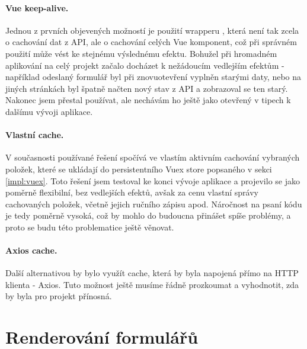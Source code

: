 \paragraph{Vue keep-alive.} Jednou z prvních objevených možností je použití wrapperu \cite{vue-keep-alive}, která není tak zcela o cachování dat z API, ale o cachování celých Vue komponent, což při správném použití může vést ke stejnému výslednému efektu. Bohužel při hromadném aplikování na celý projekt začalo docházet k nežádoucím vedlejším efektům - například odeslaný formulář byl při znovuotevření vyplněn starými daty, nebo na jiných stránkách byl špatně načten nový stav z API a zobrazoval se ten starý. Nakonec jsem  přestal používat, ale nechávám ho ještě jako otevřený v tipech k dalšímu vývoji aplikace.

\paragraph{Vlastní cache.} V současnosti používané řešení spočívá ve vlastím aktivním cachování vybraných položek, které se ukládají do persistentního Vuex store popsaného v sekci \ref{impl:vuex}. Toto řešení jsem testoval ke konci vývoje aplikace a projevilo se jako poměrně flexibilní, bez vedlejších efektů, avšak za cenu vlastní správy cachovaných položek, včetně jejich ručního zápisu apod. Náročnost na psaní kódu je tedy poměrně vysoká, což by mohlo do budoucna přinášet spíše problémy, a proto se budu této problematice ještě věnovat.

\paragraph{Axios cache.} Další alternativou by bylo využít cache, která by byla napojená přímo na HTTP klienta - Axios. Tuto možnost ještě musíme řádně prozkoumat a vyhodnotit, zda by byla pro projekt přínosná.


\section{Renderování formulářů} \label{implementation:formRender}


